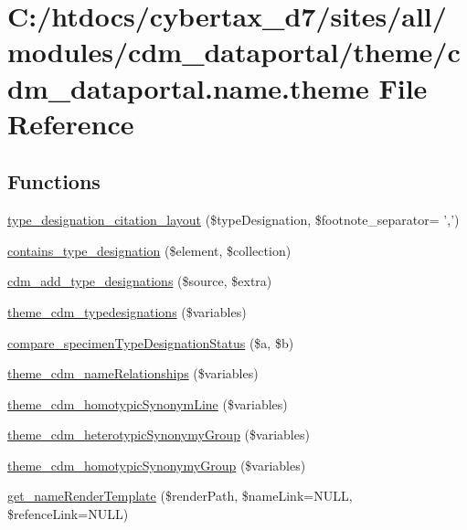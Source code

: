 \hypertarget{cdm__dataportal_8name_8theme}{\section{C\-:/htdocs/cybertax\-\_\-d7/sites/all/modules/cdm\-\_\-dataportal/theme/cdm\-\_\-dataportal.name.\-theme File Reference}
\label{cdm__dataportal_8name_8theme}
}
\subsection*{Functions}
\begin{DoxyCompactItemize}
\item 
\hyperlink{cdm__dataportal_8name_8theme_a6b59cd4450f87a941ca91b91768b0992}{type\-\_\-designation\-\_\-citation\-\_\-layout} (\$type\-Designation, \$footnote\-\_\-separator= ',')
\item 
\hyperlink{cdm__dataportal_8name_8theme_ab7dc81cf086a42ecb7565d677e8ea613}{contains\-\_\-type\-\_\-designation} (\$element, \$collection)
\item 
\hyperlink{cdm__dataportal_8name_8theme_a51efa3b24584097d57c872c5944fc5eb}{cdm\-\_\-add\-\_\-type\-\_\-designations} (\$source, \$extra)
\item 
\hyperlink{cdm__dataportal_8name_8theme_a854555b925e3cff92dba7606c056ced1}{theme\-\_\-cdm\-\_\-typedesignations} (\$variables)
\item 
\hyperlink{cdm__dataportal_8name_8theme_a02e4625fb38a9bb2a7f6f322d3f200e2}{compare\-\_\-specimen\-Type\-Designation\-Status} (\$a, \$b)
\item 
\hyperlink{cdm__dataportal_8name_8theme_a015f42191ac1385eeda0533a1e28f7ef}{theme\-\_\-cdm\-\_\-name\-Relationships} (\$variables)
\item 
\hyperlink{cdm__dataportal_8name_8theme_ae1b64c95028dbccdda7ac88633fc93bd}{theme\-\_\-cdm\-\_\-homotypic\-Synonym\-Line} (\$variables)
\item 
\hyperlink{cdm__dataportal_8name_8theme_a73b7a363e62b50ea172a99a305ab7b98}{theme\-\_\-cdm\-\_\-heterotypic\-Synonymy\-Group} (\$variables)
\item 
\hyperlink{cdm__dataportal_8name_8theme_ae1b89f64ae55cbb1be64d70c79f65266}{theme\-\_\-cdm\-\_\-homotypic\-Synonymy\-Group} (\$variables)
\item 
\hyperlink{cdm__dataportal_8name_8theme_a04e753dcb5e2a7a2e2b025f76a0f4439}{get\-\_\-name\-Render\-Template} (\$render\-Path, \$name\-Link=N\-U\-L\-L, \$refence\-Link=N\-U\-L\-L)

\end{DoxyCompactItemize}
